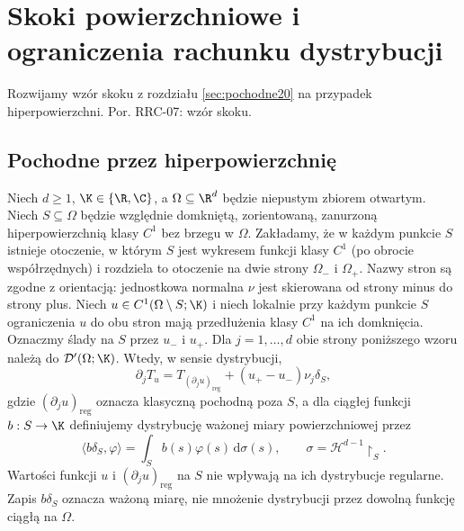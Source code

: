 
\section{Skoki powierzchniowe i ograniczenia rachunku dystrybucji}
\label{sec:dt-jumps-products}
\providecommand{\atlasref}[2]{#2}
Rozwijamy wzór skoku z rozdziału \ref{sec:pochodne20}
na przypadek hiperpowierzchni. Por.
\atlasref{PDE-07::thm:pde7-jump}{RRC-07: wzór skoku}.
\subsection{Pochodne przez hiperpowierzchnię}
\begin{twierdzenie}
\label{thm:dt-hypersurface-jump}
Niech $d\ge1$, $\K\in\{\R,\C\}$, a $\Omega\subseteq\R^d$
będzie niepustym zbiorem otwartym. Niech
$S\subseteq\Omega$ będzie względnie domkniętą,
zorientowaną, zanurzoną hiperpowierzchnią klasy $C^1$
bez brzegu w $\Omega$. Zakładamy, że w każdym
punkcie $S$ istnieje otoczenie, w którym $S$ jest
wykresem funkcji klasy $C^1$ (po obrocie współrzędnych)
i rozdziela to otoczenie na dwie strony $\Omega_-$
i $\Omega_+$. Nazwy stron są zgodne z orientacją:
jednostkowa normalna $\nu$ jest skierowana
od strony minus do strony plus.
Niech $u\in C^1(\Omega\setminus S;\K)$ i niech lokalnie
przy każdym punkcie $S$ ograniczenia $u$ do obu stron
mają przedłużenia klasy $C^1$ na ich domknięcia.
Oznaczmy ślady na $S$ przez $u_-$ i $u_+$.
Dla $j=1,\ldots,d$ obie strony poniższego wzoru
należą do $\mathcal D'(\Omega;\K)$.
Wtedy, w sensie dystrybucji,
\begin{equation}\label{eq:dt-hypersurface-jump}
 \partial_jT_u=T_{(\partial_ju)_{\mathrm{reg}}}
 +(u_+-u_-)\nu_j\delta_S,
\end{equation}
gdzie $(\partial_ju)_{\mathrm{reg}}$ oznacza klasyczną
pochodną poza $S$, a dla ciągłej funkcji $b:S\to\K$ definiujemy
dystrybucję ważonej miary powierzchniowej przez
\[
 \langle b\delta_S,\varphi\rangle
 =\int_S b(s)\varphi(s)\,\mathrm d\sigma(s),
 \qquad \sigma=\mathcal H^{d-1}\!\restriction_S.
\]
Wartości funkcji $u$ i $(\partial_ju)_{\mathrm{reg}}$ na $S$
nie wpływają na ich dystrybucje regularne.
Zapis $b\delta_S$ oznacza ważoną miarę, nie mnożenie
dystrybucji przez dowolną funkcję ciągłą na $\Omega$.
\end{twierdzenie}
